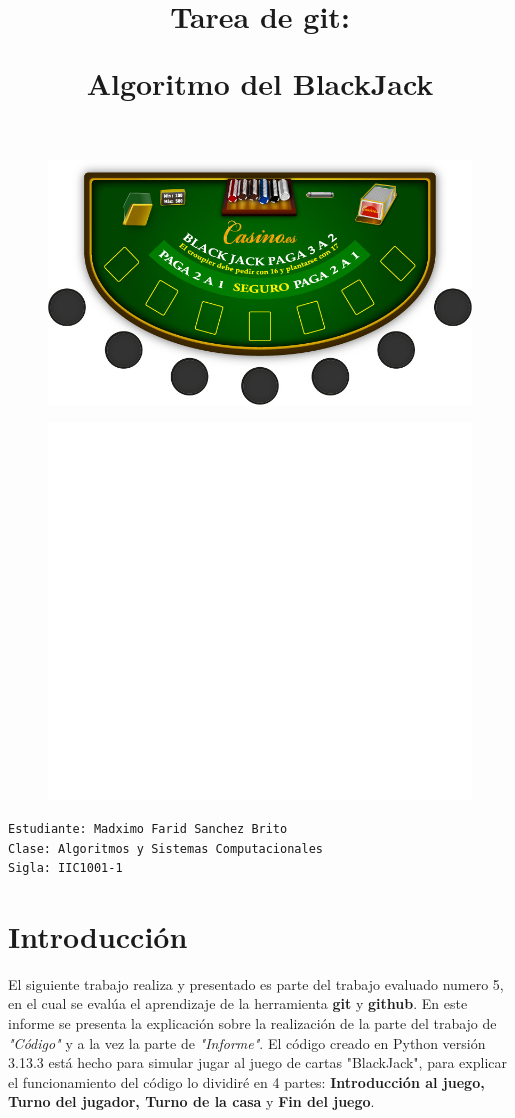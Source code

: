 \documentclass[12pt, a4paper]{article}
\title{Tarea de git: \par Algoritmo del BlackJack}
\author{}
\date{}
\begin{document}
\maketitle

\begin{figure}[h]
    \centering
    \includegraphics[width=0.7\linewidth]{Imagenes/mesa-blackjack.jpg}
    \label{fig:}
\end{figure}

\begin{figure}[h]
    \centering
    \includegraphics[width=0.5\linewidth]{Imagenes/Vacio.png}
    \label{fig:}
\end{figure}

\begin{verbatim}
Estudiante: Madximo Farid Sanchez Brito
Clase: Algoritmos y Sistemas Computacionales
Sigla: IIC1001-1

\end{verbatim}
    

\newpage

\tableofcontents

\newpage

\section{Introducción}
El siguiente trabajo realiza y presentado es parte del trabajo evaluado numero 5, en el cual se evalúa el aprendizaje de la herramienta \textbf{git} y \textbf{github}. En este informe se presenta la explicación sobre la realización de la parte del trabajo de \textit{"Código"} y a la vez la parte de \textit{"Informe"}. El código creado en Python versión 3.13.3 está hecho para simular jugar al juego de cartas "BlackJack", para explicar el funcionamiento del código lo dividiré en 4 partes: \textbf{Introducción al juego, Turno del jugador, Turno de la casa} y \textbf{Fin del juego}. 










\end{document}
